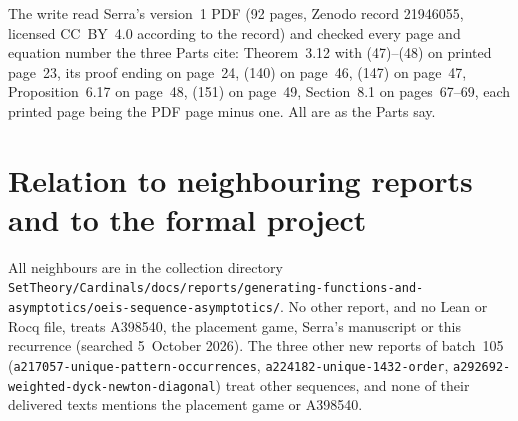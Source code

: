 \documentclass[11pt,letterpaper]{article}
\theoremstyle{remark}\newtheorem{remark}[theorem]{Remark}
\numberwithin{equation}{section}
\newcommand{\file}[1]{\nolinkurl{#1}}
\begin{document}
The write read Serra's version~1 PDF (92 pages, Zenodo record 21946055, licensed CC~BY~4.0 according to the record) and checked every page and equation number the three Parts cite: Theorem~3.12 with (47)--(48) on printed page~23, its proof ending on page~24, (140) on page~46, (147) on page~47, Proposition~6.17 on page~48, (151) on page~49, Section~8.1 on pages~67--69, each printed page being the PDF page minus one. All are as the Parts say.

\section*{Relation to neighbouring reports and to the formal project}\label{ppg:sec:neighbours}
All neighbours are in the collection directory \file{SetTheory/Cardinals/docs/reports/generating-functions-and-asymptotics/}\allowbreak\file{oeis-sequence-asymptotics/}. No other report, and no Lean or Rocq file, treats A398540, the placement game, Serra's manuscript or this recurrence (searched 5~October 2026). The three other new reports of batch~105 (\file{a217057-unique-pattern-occurrences}, \file{a224182-unique-1432-order}, \file{a292692-weighted-dyck-newton-diagonal}) treat other sequences, and none of their delivered texts mentions the placement game or A398540.
\end{document}
